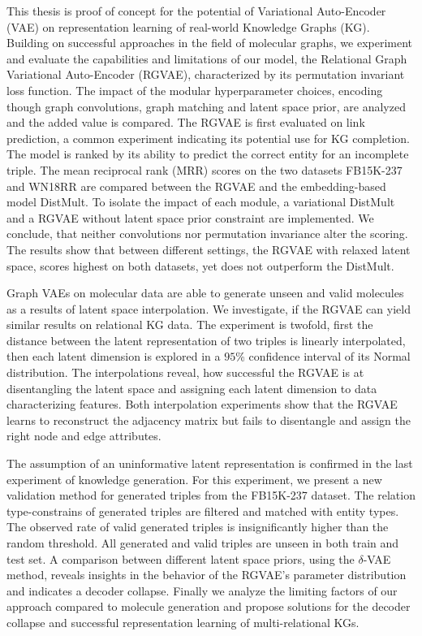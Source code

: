 \documentclass{article}
\makeatletter
\let\oldabstract\abstract
\let\oldendabstract\endabstract
\renewenvironment{abstract}
{\renewenvironment{quotation}%
               {\list{}{\addtolength{\leftmargin}{3em} %
                        \listparindent 1.5em%
                        \itemindent    \listparindent%
                        \rightmargin   \leftmargin%
                        \parsep        \z@ \@plus\p@}%
                \item\relax}%
               {\endlist}%
\oldabstract}
{\oldendabstract}
\makeatother
\begin{document}
\newpage
{}

\begin{abstract}

This thesis is proof of concept for the potential of Variational Auto-Encoder (VAE) on representation learning of real-world Knowledge Graphs (KG). Building on successful approaches in the field of molecular graphs, we experiment and evaluate the capabilities and limitations of our model, the Relational Graph Variational Auto-Encoder (RGVAE), characterized by its permutation invariant loss function. The impact of the modular hyperparameter choices, encoding though graph convolutions, graph matching and latent space prior, are analyzed and the added value is compared. The RGVAE is first evaluated on link prediction, a common experiment indicating its potential use for KG completion. The model is ranked by its ability to predict the correct entity for an incomplete triple. The mean reciprocal rank (MRR) scores on the two datasets FB15K-237 and WN18RR are compared between the RGVAE and the embedding-based model DistMult.
To isolate the impact of each module, a variational DistMult and a RGVAE without latent space prior constraint are implemented. We conclude, that neither convolutions nor permutation invariance alter the scoring. The results show that between different settings, the RGVAE with relaxed latent space, scores highest on both datasets, yet does not outperform the DistMult.

Graph VAEs on molecular data are able to generate unseen and valid molecules as a results of latent space interpolation. We investigate, if the RGVAE can yield similar results on relational KG data. The experiment is twofold, first the distance between the latent representation of two triples is linearly interpolated, then each latent dimension is explored in a $95$\% confidence interval of its Normal distribution. The interpolations reveal, how successful the RGVAE is at disentangling the latent space and assigning each latent dimension to data characterizing features. Both interpolation experiments show that the RGVAE learns to reconstruct the adjacency matrix but fails to disentangle and assign the right node and edge attributes. 

The assumption of an uninformative latent representation is confirmed in the last experiment of knowledge generation. For this experiment, we present a new validation method for generated triples from the FB15K-237 dataset. The relation type-constrains of generated triples are filtered and matched with entity types. The observed rate of valid generated triples is insignificantly higher than the random threshold. All generated and valid triples are unseen in both train and test set. A comparison between different latent space priors, using the $\delta$-VAE method, reveals insights in the behavior of the RGVAE's parameter distribution and indicates a decoder collapse. Finally we analyze the limiting factors of our approach compared to molecule generation and propose solutions for the decoder collapse and successful representation learning of multi-relational KGs. 
\end{abstract}
\newpage
\end{document}
